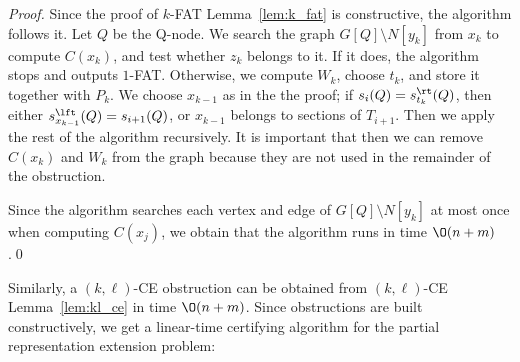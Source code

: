 \begin{proof}
Since the proof of $k$-FAT Lemma~\ref{lem:k_fat} is constructive, the algorithm follows it.  Let $Q$
be the Q-node.  We search the graph $G[Q] \setminus N[y_k]$ from $x_k$ to compute $C(x_k)$, and test
whether $z_k$ belongs to it. If it does, the algorithm stops and outputs $1$-FAT. Otherwise, we compute
$W_k$, choose $t_k$, and store it together with $P_k$.
We choose $x_{k-1}$ as in the the proof; if $s_i(Q) = s_{t_k}^\rt(Q)$, then either
$s_{x_{k-1}}^\lft(Q) = s_{i+1}(Q)$, or $x_{k-1}$ belongs to sections of $T_{i+1}$.
Then we apply the rest of the algorithm recursively.  It is important that then we can remove
$C(x_k)$ and $W_k$ from the graph because they are not used in the remainder of the obstruction.

Since the algorithm searches each vertex and edge of $G[Q] \setminus N[y_k]$ at most once when
computing $C(x_j)$, we obtain that the algorithm runs in time $\O(n+m)$.\qed
\end{proof}

Similarly, a $(k,\ell)$-CE obstruction can be obtained from $(k,\ell)$-CE Lemma~\ref{lem:kl_ce} in
time $\O(n+m)$.  Since obstructions are built constructively, we get a linear-time certifying
algorithm for the partial representation extension problem:

